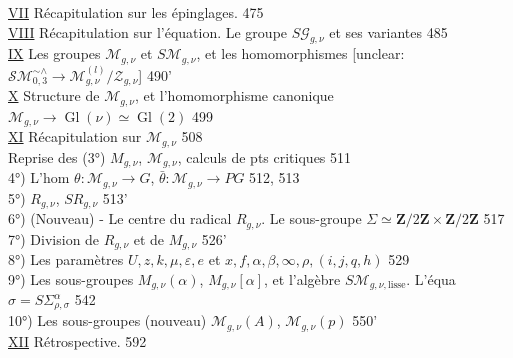 \vspace{1em}
\noindent \underline{VII} Récapitulation sur les épinglages. \hfill 475\\
\underline{VIII} Récapitulation sur l'équation. Le groupe $S\mathcal{G}_{g,\nu}$ et ses variantes \hfill 485\\
\underline{IX} Les groupes $\mathcal{M}_{g,\nu}$ et $S\mathcal{M}_{g,\nu}$, et les homomorphismes [unclear: $\mathcal{S}\mathcal{M}_{0,3}^{\sim \wedge} \to \mathcal{M}_{g,\nu}^{(l)}/\mathcal{Z}_{g,\nu}$] \hfill 490'\\
\underline{X} Structure de $\mathcal{M}_{g,\nu}$, et l'homomorphisme canonique $\mathcal{M}_{g,\nu} \to \operatorname{Gl}(\nu) \simeq \operatorname{Gl}(2)$ \hfill 499\\
\underline{XI} Récapitulation sur $\mathcal{M}_{g,\nu}$ \hfill 508\\
\hspace*{1em} Reprise des (3°) $M_{g,\nu}$, $\mathcal{M}_{g,\nu}$, calculs de pts critiques \hfill 511\\
\hspace*{1em} 4°) L'hom $\theta: \mathcal{M}_{g,\nu} \to G$, $\bar{\theta}: \mathcal{M}_{g,\nu} \to P G$ \hfill 512, 513\\
\hspace*{1em} 5°) $R_{g,\nu}$, $S R_{g,\nu}$ \hfill 513'\\
\hspace*{1em} 6°) (Nouveau) - Le centre du radical $R_{g,\nu}$. Le sous-groupe $\Sigma \simeq \mathbf{Z}/2\mathbf{Z} \times \mathbf{Z}/2\mathbf{Z}$ \hfill 517\\
\hspace*{1em} 7°) Division de $R_{g,\nu}$ et de $M_{g,\nu}$ \hfill 526'\\
\hspace*{1em} 8°) Les paramètres $U, z, k, \mu, \varepsilon, e$ et $x, f, \alpha, \beta, \infty, \rho, (i, j, q, h)$ \hfill 529\\
\hspace*{1em} 9°) Les sous-groupes $M_{g,\nu}(\alpha)$, $M_{g,\nu}[\alpha]$, et l'algèbre $S\mathcal{M}_{g,\nu, \text{lisse}}$. L'équa $\sigma = S \Sigma_{\rho, \sigma}^\alpha$ \hfill 542\\
\hspace*{1em} 10°) Les sous-groupes (nouveau) $\mathcal{M}_{g,\nu}(A)$, $\mathcal{M}_{g,\nu}(p)$ \hfill 550'\\
\underline{XII} Rétrospective. \hfill 592

\newpage

